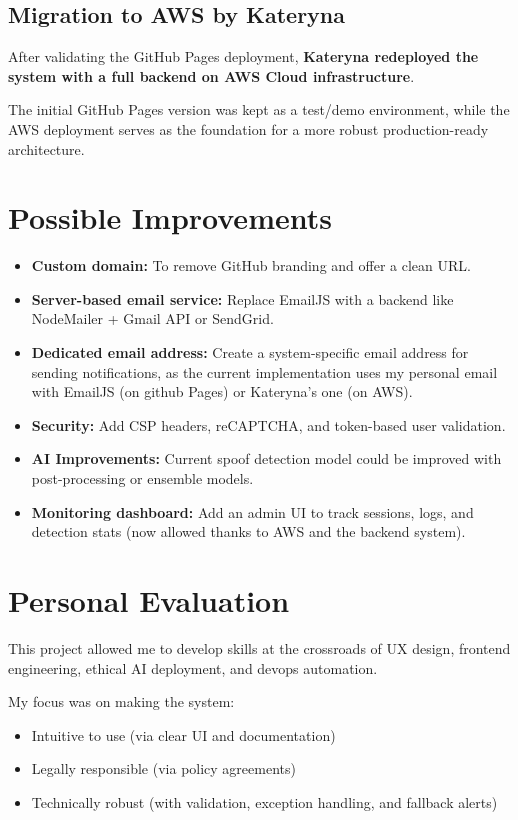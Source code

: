 \documentclass[a4paper,12pt]{article}
\begin{document}
\subsection*{Migration to AWS by Kateryna}
After validating the GitHub Pages deployment, \textbf{Kateryna redeployed the system with a full backend on AWS Cloud infrastructure}.

The initial GitHub Pages version was kept as a test/demo environment, while the AWS deployment serves as the foundation for a more robust production-ready architecture.

\section{Possible Improvements}
\begin{itemize}
    \item \textbf{Custom domain:} To remove GitHub branding and offer a clean URL.
    \item \textbf{Server-based email service:} Replace EmailJS with a backend like NodeMailer + Gmail API or SendGrid.
    \item \textbf{Dedicated email address:} Create a system-specific email address for sending notifications, as the current implementation uses my personal email with EmailJS (on github Pages) or Kateryna's one (on AWS).
    \item \textbf{Security:} Add CSP headers, reCAPTCHA, and token-based user validation.
    \item \textbf{AI Improvements:} Current spoof detection model could be improved with post-processing or ensemble models.
    \item \textbf{Monitoring dashboard:} Add an admin UI to track sessions, logs, and detection stats (now allowed thanks to AWS and the backend system).
\end{itemize}

\section{Personal Evaluation}
This project allowed me to develop skills at the crossroads of UX design, frontend engineering, ethical AI deployment, and devops automation.

My focus was on making the system:
\begin{itemize}
    \item Intuitive to use (via clear UI and documentation)
    \item Legally responsible (via policy agreements)
    \item Technically robust (with validation, exception handling, and fallback alerts)
\end{itemize}
\end{document}
